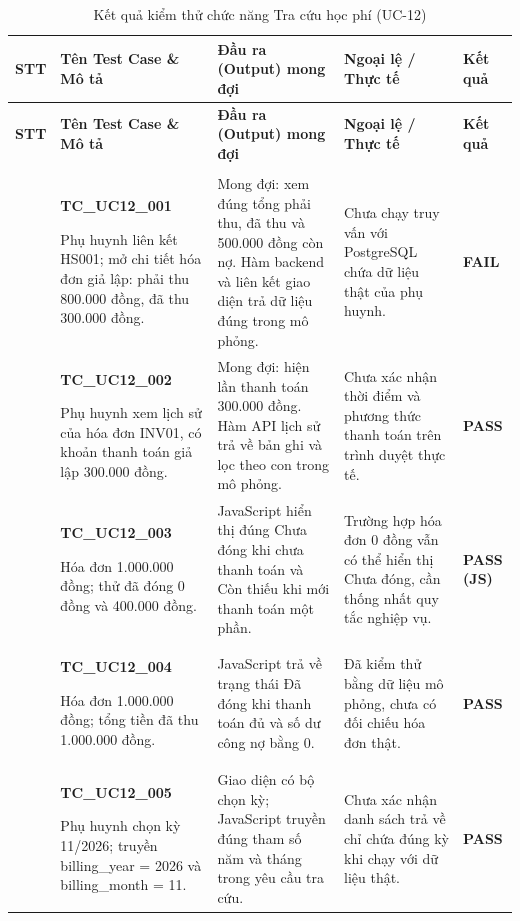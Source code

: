 \vspace{0.4em}
\begin{longtable}{|>{\centering\arraybackslash}p{0.8cm}|>{\raggedright\arraybackslash}p{4.6cm}|>{\raggedright\arraybackslash}p{3.8cm}|>{\raggedright\arraybackslash}p{3.8cm}|>{\centering\arraybackslash}p{1.5cm}|}
\caption{Kết quả kiểm thử chức năng Tra cứu học phí (UC-12)}\label{tab:test-uc12}\\
\hline
\textbf{STT} & \textbf{Tên Test Case \& Mô tả} & \textbf{Đầu ra (Output) mong đợi} & \textbf{Ngoại lệ / Thực tế} & \textbf{Kết quả} \\ \hline
\endfirsthead
\hline
\textbf{STT} & \textbf{Tên Test Case \& Mô tả} & \textbf{Đầu ra (Output) mong đợi} & \textbf{Ngoại lệ / Thực tế} & \textbf{Kết quả} \\ \hline
\endhead
\hline \multicolumn{5}{r}{\scriptsize\itshape Xem tiếp ở trang sau} \\
\endfoot
\hline
\endlastfoot
1 & \textbf{TC\_UC12\_001}\par Phụ huynh liên kết HS001; mở chi tiết hóa đơn giả lập: phải thu 800.000 đồng, đã thu 300.000 đồng. & Mong đợi: xem đúng tổng phải thu, đã thu và 500.000 đồng còn nợ. Hàm backend và liên kết giao diện trả dữ liệu đúng trong mô phỏng. & Chưa chạy truy vấn với PostgreSQL chứa dữ liệu thật của phụ huynh. & \textbf{FAIL} \\ \hline
2 & \textbf{TC\_UC12\_002}\par Phụ huynh xem lịch sử của hóa đơn INV01, có khoản thanh toán giả lập 300.000 đồng. & Mong đợi: hiện lần thanh toán 300.000 đồng. Hàm API lịch sử trả về bản ghi và lọc theo con trong mô phỏng. & Chưa xác nhận thời điểm và phương thức thanh toán trên trình duyệt thực tế. & \textbf{PASS} \\ \hline
3 & \textbf{TC\_UC12\_003}\par Hóa đơn 1.000.000 đồng; thử đã đóng 0 đồng và 400.000 đồng. & JavaScript hiển thị đúng Chưa đóng khi chưa thanh toán và Còn thiếu khi mới thanh toán một phần. & Trường hợp hóa đơn 0 đồng vẫn có thể hiển thị Chưa đóng, cần thống nhất quy tắc nghiệp vụ. & \textbf{PASS (JS)} \\ \hline
4 & \textbf{TC\_UC12\_004}\par Hóa đơn 1.000.000 đồng; tổng tiền đã thu 1.000.000 đồng. & JavaScript trả về trạng thái Đã đóng khi thanh toán đủ và số dư công nợ bằng 0. & Đã kiểm thử bằng dữ liệu mô phỏng, chưa có đối chiếu hóa đơn thật. & \textbf{PASS} \\ \hline
5 & \textbf{TC\_UC12\_005}\par Phụ huynh chọn kỳ 11/2026; truyền billing\_year = 2026 và billing\_month = 11. & Giao diện có bộ chọn kỳ; JavaScript truyền đúng tham số năm và tháng trong yêu cầu tra cứu. & Chưa xác nhận danh sách trả về chỉ chứa đúng kỳ khi chạy với dữ liệu thật. & \textbf{PASS} \\ \hline

\end{longtable}
